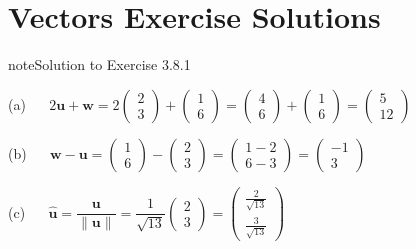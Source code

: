 \documentclass[letterpaper,10pt,english]{jupyterBook}
\begin{document}
\sphinxstepscope


\chapter{Vectors Exercise Solutions}
\label{\detokenize{_pages/A3_Vectors_exercises_solutions:vectors-exercise-solutions}}\label{\detokenize{_pages/A3_Vectors_exercises_solutions:vectors-exercises-solutions-section}}\label{\detokenize{_pages/A3_Vectors_exercises_solutions::doc}} \label{_pages/A3_Vectors_exercises_solutions:_pages/A3_Vectors_exercises_solutions-solution-0}

\begin{sphinxadmonition}{note}{Solution to Exercise 3.8.1}



\sphinxAtStartPar
(a)   \(2\mathbf{u} + \mathbf{w} = 2\begin{pmatrix} 2 \\ 3 \end{pmatrix} + \begin{pmatrix} 1 \\ 6 \end{pmatrix} 
= \begin{pmatrix} 4 \\ 6 \end{pmatrix} + \begin{pmatrix} 1 \\ 6 \end{pmatrix} 
= \begin{pmatrix} 5 \\ 12 \end{pmatrix}\)

\sphinxAtStartPar
(b)   \(\mathbf{w} - \mathbf{u} = \begin{pmatrix} 1 \\ 6 \end{pmatrix} - \begin{pmatrix} 2 \\ 3 \end{pmatrix} 
= \begin{pmatrix} 1 - 2 \\ 6 - 3 \end{pmatrix} = \begin{pmatrix} -1 \\ 3 \end{pmatrix}\)

\sphinxAtStartPar
(c)   \(\hat{\mathbf{u}} = \dfrac{\mathbf{u}}{\|\mathbf{u}\|} = \dfrac{1}{\sqrt{13}} \begin{pmatrix} 2 \\ 3 \end{pmatrix} 
= \begin{pmatrix} \frac{2}{\sqrt{13}} \\ \frac{3}{\sqrt{13}} \end{pmatrix}\)


\end{sphinxadmonition}
\end{document}
